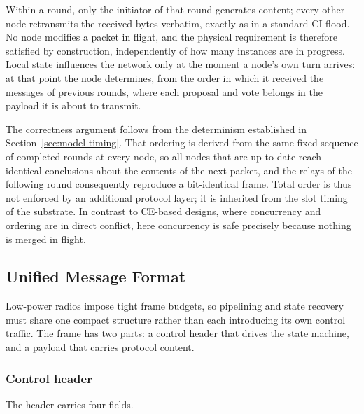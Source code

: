 \documentclass[journal]{IEEEtran}
\newcommand{\CI}{CI}                      %
\newcommand{\CE}{CE}                      %
\begin{document}
Within a round, only the initiator of that round generates content; every
other node retransmits the received bytes verbatim, exactly as in a
standard \CI{} flood. No node modifies a packet in flight, and the
physical requirement is therefore satisfied by construction, independently
of how many instances are in progress. Local state influences the network
only at the moment a node's own turn arrives: at that point the node
determines, from the order in which it received the messages of previous
rounds, where each proposal and vote belongs in the payload it is about to
transmit.

The correctness argument follows from the determinism established in
Section~\ref{sec:model-timing}. That ordering is derived from the same
fixed sequence of completed rounds at every node, so all nodes that are
up to date reach identical conclusions about the contents of the next
packet, and the relays of the following round consequently reproduce a
bit-identical frame. Total order is thus not enforced by an additional
protocol layer; it is inherited from the slot timing of the substrate. In
contrast to \CE-based designs, where concurrency and ordering are in
direct conflict, here concurrency is safe precisely because nothing is
merged in flight.

\subsection{Unified Message Format}
\label{sec:design-format}


Low-power radios impose tight frame budgets, so pipelining and state
recovery must share one compact structure rather than each introducing its
own control traffic. The frame has two parts: a control header that drives
the state machine, and a payload that carries protocol content.

\subsubsection{Control header}
The header carries four fields.
\end{document}
